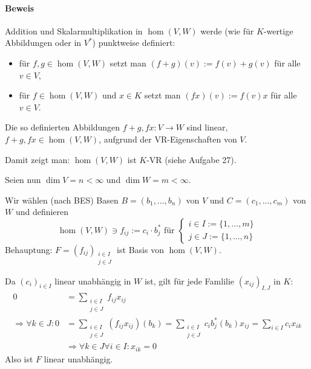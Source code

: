 \paragraph{Beweis}
	Addition und Skalarmultiplikation in $\hom (V,W)$ werde (wie für $K$-wertige Abbildungen oder in $V^*$) punktweise definiert:
	\begin{itemize}
		\item für $f,g \in \hom (V,W)$ setzt man $(f+g)(v) := f(v) + g(v)$ für alle $v\in V$,
		\item für $f\in \hom (V,W)$ und $x\in K$ setzt man $(fx)(v) := f(v)x$ für alle $v\in V$.
	\end{itemize}
	Die so definierten Abbildungen $f+g,fx: V\to W$ sind linear, $f+g, fx\in \hom (V,W)$, aufgrund der VR-Eigenschaften von $V$.
	
	Damit zeigt man: $\hom (V,W)$ ist $K$-VR (siehe Aufgabe 27).
	
	Seien nun $\dim V = n < \infty$ und $\dim W = m < \infty$.
	
	Wir wählen (nach BES) Basen $B = (b_1,...,b_n)$ von $V$ und $C=(c_1,...,c_m)$ von $W$ und definieren
		\begin{equation*}
			\hom (V,W) \ni f_{ij}:= c_i\cdot b_j^* \text{ für } 
				\begin{cases}
					i\in I := \{1,...,m\}\\
					j\in J := \{1,...,n\}
				\end{cases}
		\end{equation*}
	Behauptung: $F=(f_{ij})_{\substack{i\in I\\j \in J}}$ ist Basis von $\hom (V,W)$.
	
	Da $(c_i)_{i\in I}$ linear unabhängig in $W$ ist, gilt für jede Famlilie $(x_{ij})_{I,J}$ in $K$:
		\begin{align*}
			0 &= \sum_{\substack{i\in I\\j \in J}} f_{ij}x_{ij} \\
			\Rightarrow \forall k \in J: 0 &= \sum_{\substack{i\in I\\j \in J}} (f_{ij}x_{ij})(b_k) = \sum_{\substack{i\in I\\j \in J}} c_i b_j^* (b_k) x_{ij} = \sum_{i\in I} c_ix_{ik} \\
			&\Rightarrow \forall k\in J\forall i\in I:x_{ik} = 0
		\end{align*}
	Also ist $F$ linear unabhängig.
	

